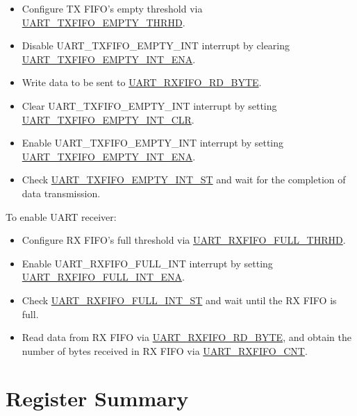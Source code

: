 \documentclass[main\_\_EN.tex]{subfiles}
\begin{document}
\begin{itemize}
    \item Configure TX FIFO's empty threshold via \hyperref[fielddesc:UARTTXFIFOEMPTYTHRHD]{UART\_TXFIFO\_EMPTY\_THRHD}.
    \item Disable UART\_TXFIFO\_EMPTY\_INT interrupt by clearing \hyperref[fielddesc:UARTTXFIFOEMPTYINTENA]{UART\_TXFIFO\_EMPTY\_INT\_ENA}.
    \item Write data to be sent to \hyperref[fielddesc:UARTRXFIFORDBYTE]{UART\_RXFIFO\_RD\_BYTE}.
    \item Clear UART\_TXFIFO\_EMPTY\_INT interrupt by setting  \hyperref[fielddesc:UARTTXFIFOEMPTYINTCLR]{UART\_TXFIFO\_EMPTY\_INT\_CLR}.
    \item Enable UART\_TXFIFO\_EMPTY\_INT interrupt by setting \hyperref[fielddesc:UARTTXFIFOEMPTYINTENA]{UART\_TXFIFO\_EMPTY\_INT\_ENA}.
    \item Check \hyperref[fielddesc:UARTTXFIFOEMPTYINTST]{UART\_TXFIFO\_EMPTY\_INT\_ST} and wait for the completion of data transmission.
\end{itemize}

To enable UART receiver:
\begin{itemize}
    \item Configure RX FIFO's full threshold via \hyperref[fielddesc:UARTRXFIFOFULLTHRHD]{UART\_RXFIFO\_FULL\_THRHD}.
    \item Enable UART\_RXFIFO\_FULL\_INT interrupt by setting \hyperref[fielddesc:UARTRXFIFOFULLINTENA]{UART\_RXFIFO\_FULL\_INT\_ENA}.
    \item Check \hyperref[fielddesc:UARTRXFIFOFULLINTST]{UART\_RXFIFO\_FULL\_INT\_ST} and wait until the RX FIFO is full.
    \item Read data from RX FIFO via  \hyperref[fielddesc:UARTRXFIFORDBYTE]{UART\_RXFIFO\_RD\_BYTE}, and obtain the number of bytes received in RX FIFO via \hyperref[fielddesc:UARTRXFIFOCNT]{UART\_RXFIFO\_CNT}.
\end{itemize}





\clearpage
\section{Register Summary}
\label{sec:uart-reg-summ}
\hypertarget{uart-reg-summ}{}
\end{document}
